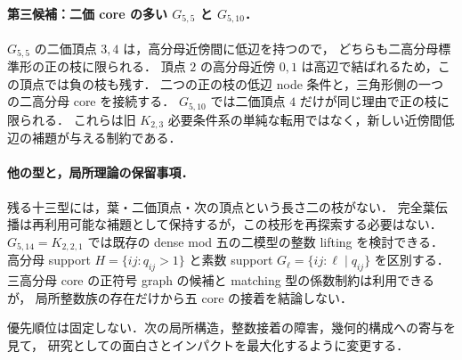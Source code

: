\paragraph{第三候補：二価 core の多い $G_{5,5}$ と $G_{5,10}$．}
$G_{5,5}$ の二価頂点 $3,4$ は，高分母近傍間に低辺を持つので，
どちらも二高分母標準形の正の枝に限られる．
頂点 $2$ の高分母近傍 $0,1$ は高辺で結ばれるため，この頂点では負の枝も残す．
二つの正の枝の低辺 node 条件と，三角形側の一つの二高分母 core を接続する．
$G_{5,10}$ では二価頂点 $4$ だけが同じ理由で正の枝に限られる．
これらは旧 $K_{2,3}$ 必要条件系の単純な転用ではなく，新しい近傍間低辺の補題が与える制約である．

\paragraph{他の型と，局所理論の保留事項．}
残る十三型には，葉・二価頂点・次の頂点という長さ二の枝がない．
完全葉伝播は再利用可能な補題として保持するが，この枝形を再探索する必要はない．
$G_{5,14}=K_{2,2,1}$ では既存の dense mod 五の二模型の整数 lifting を検討できる．
高分母 support $H=\{ij:q_{ij}>1\}$ と素数 support $G_\ell=\{ij:\ell\mid q_{ij}\}$ を区別する．
三高分母 core の正符号 graph の候補と matching 型の係数制約は利用できるが，
局所整数族の存在だけから五 core の接着を結論しない．

優先順位は固定しない．次の局所構造，整数接着の障害，幾何的構成への寄与を見て，
研究としての面白さとインパクトを最大化するように変更する．
